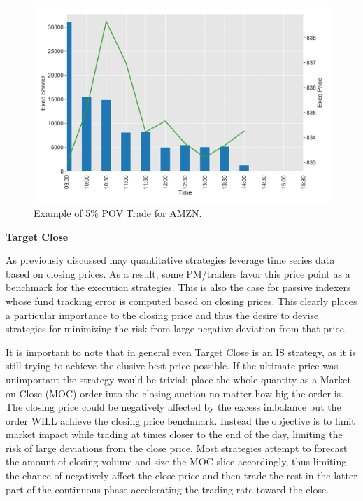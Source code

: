 	\begin{figure}[!ht]
	\centering
	\includegraphics[width=\textwidth]{chapters/chapter_exec_models/figures/pov.png} 
	\caption{Example of 5\% POV Trade for AMZN. \label{fig:pov}}
	\end{figure}


\noindent\textbf{Target Close} \twomedskip


As previously discussed may quantitative strategies leverage time series data based on closing prices. As a result, some PM/traders favor this price point as a benchmark for the execution strategies. This is also the case for passive indexers whose fund tracking error is computed based on closing prices. This clearly places a particular importance to the closing price and thus the desire to devise strategies for minimizing the risk from large negative deviation from that price.


It is important to note that in general even Target Close is an IS strategy, as it is still trying to achieve the elusive best price possible. If the ultimate price was unimportant the strategy would be trivial: place the whole quantity as a Market-on-Close (MOC) order into the closing auction no matter how big the order is. The closing price could be negatively affected by the excess imbalance but the order WILL achieve the closing price benchmark. Instead the objective is to limit market impact while trading at times closer to the end of the day, limiting the risk of large deviations from the close price. Most strategies attempt to forecast the amount of closing volume and size the MOC slice accordingly, thus limiting the chance of negatively affect the close price and then trade the rest in the latter part of the continuous phase accelerating the trading rate toward the close. \twomedskip

